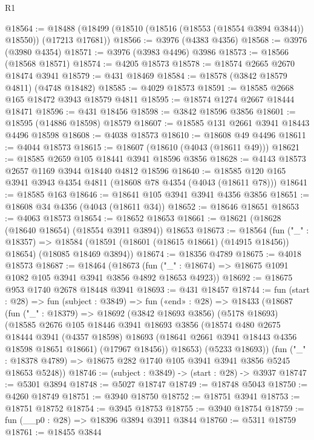 \begin{lexlean}{R1}
\begin{coremodule}
@18564 := @18488 (@18499 (@18510 (@18516 (@18553 (@18554 @3894 @3844)) @18550)) (@17213 @17681))
@18566 := @3976 (@4383 @4356)
@18568 := @3976 (@3980 @4354)
@18571 := @3976 (@3983 @4496) @3986
@18573 := @18566 (@18568 @18571)
@18574 := @4205 @18573
@18578 := @18574 @2665 @2670 @18474 @3941
@18579 := @431 @18469
@18584 := @18578 (@3842 @18579 @4811) (@4748 @18482)
@18585 := @4029 @18573
@18591 := @18585 @2668 @165 @18472 @3943 @18579 @4811
@18595 := @18574 @1274 @2667 @18444 @18471
@18596 := @431 @18456
@18598 := @3842 @18596 @3856
@18601 := @18595 (@14886 @18598) @18579
@18607 := @18585 @131 @2661 @3941 @18443 @4496 @18598
@18608 := @4038 @18573
@18610 := @18608 @49 @4496
@18611 := @4044 @18573
@18615 := @18607 (@18610 (@4043 (@18611 @49)))
@18621 := @18585 @2659 @105 @18441 @3941 @18596 @3856
@18628 := @4143 @18573 @2657 @1169 @3944 @18440 @4812 @18596
@18640 := @18585 @120 @165 @3941 @3943 @4354 @4811 (@18608 @78 @4354 (@4043 (@18611 @78)))
@18641 := @18585 @163
@18646 := @18641 @105 @3941 @3941 @4356 @3856
@18651 := @18608 @34 @4356 (@4043 (@18611 @34))
@18652 := @18646 @18651
@18653 := @4063 @18573
@18654 := @18652 @18653
@18661 := @18621 (@18628 (@18640 @18654) (@18554 @3911 @3894)) @18653
@18673 := @18564
    (fun ("_" : @18357) =>
    @18584 (@18591 (@18601 (@18615 @18661) (@14915 @18456)) @18654) (@18085 @18469 @3894))
@18674 := @18356 @4789
@18675 := @4018 @18573
@18687 := @18464
    (@18673 (fun ("_" : @18674) => @18675 @1091 @1082 @105 @3941 @3941 @3856 @4892 @18653 @4923))
@18692 := @18675 @953 @1740 @2678 @18448 @3941
@18693 := @431 @18457
@18744 := fun (start : @28) =>
  fun (subject : @3849) =>
  fun («end» : @28) =>
  @18433
    (@18687
      (fun ("_" : @18379) =>
      @18692
        (@3842 @18693 @3856)
        (@5178 @18693)
        (@18585
          @2676
          @105
          @18446
          @3941
          @18693
          @3856
          (@18574
            @480
            @2675
            @18444
            @3941
            (@4357 @18598)
            @18693
            (@18641 @2661 @3941 @18443 @4356 @18598 @18651 @18661)
            (@17967 @18456))
          @18653)
        (@5233 @18693))
      (fun ("_" : @18378 @4789) => @18675 @282 @1740 @105 @3941 @3941 @3856 @5245 @18653 @5248))
@18746 := (subject : @3849) -> (start : @28) -> @3937
@18747 := @5301 @3894
@18748 := @5027 @18747
@18749 := @18748 @5043
@18750 := @4260 @18749
@18751 := @3940 @18750
@18752 := @18751 @3941
@18753 := @18751 @18752
@18754 := @3945 @18753
@18755 := @3940 @18754
@18759 := fun (__p0 : @28) => @18396 @3894 @3911 @3844
@18760 := @5311 @18759
@18761 := @18455 @3844

\end{coremodule}
\end{lexlean}
